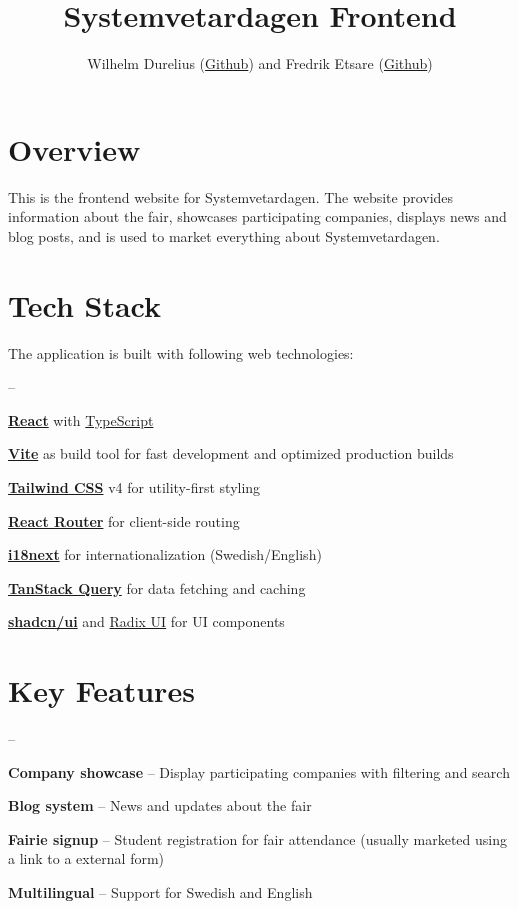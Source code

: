 \documentclass[a4paper,10pt,oneside]{article}
\title{Systemvetardagen Frontend}
\author{Wilhelm Durelius (\href{https://github.com/Durelius}{Github}) and Fredrik Etsare (\href{https://github.com/fetsare}{Github}) }
\begin{document}
\maketitle

\section{Overview}

This is the frontend website for Systemvetardagen.
The website provides information about the fair, showcases participating companies, displays news and blog posts, and is used to market everything about Systemvetardagen.

\section{Tech Stack}

The application is built with following web technologies:

\begin{list}{--}{}
    \item \textbf{\href{https://react.dev}{React}} with \href{https://www.typescriptlang.org}{TypeScript}
    \item \textbf{\href{https://vitejs.dev}{Vite}} as build tool for fast development and optimized production builds
    \item \textbf{\href{https://tailwindcss.com}{Tailwind CSS}} v4 for utility-first styling
    \item \textbf{\href{https://reactrouter.com}{React Router}} for client-side routing
    \item \textbf{\href{https://www.i18next.com}{i18next}} for internationalization (Swedish/English)
    \item \textbf{\href{https://tanstack.com/query}{TanStack Query}} for data fetching and caching
    \item \textbf{\href{https://ui.shadcn.com}{shadcn/ui}} and \href{https://www.radix-ui.com}{Radix UI} for UI components
\end{list}

\section{Key Features}

\begin{list}{--}{}
    \item \textbf{Company showcase} -- Display participating companies with filtering and search
    \item \textbf{Blog system} -- News and updates about the fair
    \item \textbf{Fairie signup} -- Student registration for fair attendance (usually marketed using a link to a external form)
    \item \textbf{Multilingual} -- Support for Swedish and English
\end{list}
\end{document}
